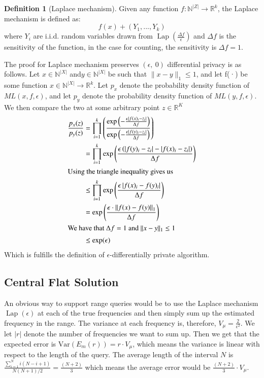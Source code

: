 \documentclass[11pt]{article}
\theoremstyle{definition}
\newtheorem{definition}{Definition}[section]
\begin{document}
\begin{definition}[Laplace mechanism]\label{lap}
Given any function $f:\mathbb{N}^{|Z|}\rightarrow \mathbb{R}^k$, the Laplace mechanism is defined as: \[f(x) + (Y_1,...,Y_k)\]
where $Y_i$ are i.i.d. random variables drawn from $\operatorname{Lap}(\frac{\Delta f}{\epsilon})$ and $\Delta f$ is the sensitivity of the function, in the case for counting, the sensitivity is $\Delta f=1$.
\end{definition}
The proof for Laplace mechanism preserves $(\epsilon, \ 0)$ differential privacy is as follows.
Let $x\in\mathbb{N}^{|X|}$ and$y\in\mathbb{N}^{|X|}$ be such that $\lVert x-y\rVert_1\leq 1$, and let f(·) be some function $x\in\mathbb{N}^{|X|}\rightarrow \mathbb{R}^{k}$. Let $p_x$ denote the probability density function of $ML(x,f,\epsilon)$, and let $p_y$ denote the probability density function of $ML(y,f,\epsilon)$. We then compare the two at some arbitrary point $z\in\mathbb{R}^{K}$
\begin{align*}
\frac{p_{x}(z)}{p_{y}(z)} &=\prod_{i=1}^{k}\left(\frac{\exp \left(-\frac{\epsilon\left|f(x)_{i}-z_{i}\right|}{\Delta f}\right)}{\exp \left(-\frac{\epsilon\left|f(y)_{i}-z_{i}\right|}{\Delta f}\right)}\right) \\
&=\prod_{i=1}^{k} \exp \left(\frac{\epsilon\left(\left|f(y)_{i}-z_{i}\right|-\left|f(x)_{i}-z_{i}\right|\right)}{\Delta f}\right) \\
\intertext{Using the triangle inequality gives us }
& \leq \prod_{i=1}^{k} \exp \left(\frac{\epsilon\left|f(x)_{i}-f(y)_{i}\right|}{\Delta f}\right) \\
&=\exp \left(\frac{\epsilon \cdot\|f(x)-f(y)\|_{1}}{\Delta f}\right) \\
\intertext{We have that $\Delta f = 1$ and $\lVert x-y\rVert_1\leq 1$  }
& \leq \exp (\epsilon) 
\end{align*}
Which is fulfills the definition of $\epsilon$-differentially private algorithm.



\subsection{Central Flat Solution}\label{teo_cen_flat}
An obvious way to support range queries would be to use the Laplace mechanism $\operatorname{Lap}(\epsilon)$ at each of the true frequencies and then simply sum up the estimated frequency in the range. The variance at each frequency is, therefore, $V_\mu=\frac{2}{\epsilon^2}$. We let $|r|$ denote the number of frequencies we want to sum up. Then we get that the expected error is $\mathrm{Var}(E_m (r))=r\cdot V_\mu$, which means the variance is linear with respect to the length of the query. The average length of the interval $N$ is $\frac{\sum_{i=1}^{N} i(N-i+1)}{N(N+1) / 2}=\frac{(N+2)}{3}$ which means the average error would be $\frac{(N+2)}{3}\cdot V_\mu$.
\end{document}
